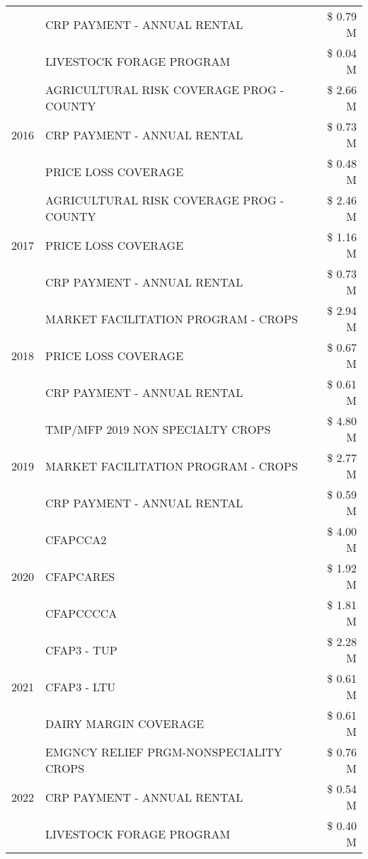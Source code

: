 \begin{tabular}{llr}
 & CRP PAYMENT - ANNUAL RENTAL & \$ 0.79 M \\
 & LIVESTOCK FORAGE PROGRAM & \$ 0.04 M \\
\cline{1-3}
\multirow[t]{3}{*}{2016} & AGRICULTURAL RISK COVERAGE PROG - COUNTY & \$ 2.66 M \\
 & CRP PAYMENT - ANNUAL RENTAL & \$ 0.73 M \\
 & PRICE LOSS COVERAGE & \$ 0.48 M \\
\cline{1-3}
\multirow[t]{3}{*}{2017} & AGRICULTURAL RISK COVERAGE PROG - COUNTY & \$ 2.46 M \\
 & PRICE LOSS COVERAGE & \$ 1.16 M \\
 & CRP PAYMENT - ANNUAL RENTAL & \$ 0.73 M \\
\cline{1-3}
\multirow[t]{3}{*}{2018} & MARKET FACILITATION PROGRAM - CROPS & \$ 2.94 M \\
 & PRICE LOSS COVERAGE & \$ 0.67 M \\
 & CRP PAYMENT - ANNUAL RENTAL & \$ 0.61 M \\
\cline{1-3}
\multirow[t]{3}{*}{2019} & TMP/MFP 2019 NON SPECIALTY CROPS & \$ 4.80 M \\
 & MARKET FACILITATION PROGRAM - CROPS & \$ 2.77 M \\
 & CRP PAYMENT - ANNUAL RENTAL & \$ 0.59 M \\
\cline{1-3}
\multirow[t]{3}{*}{2020} & CFAPCCA2 & \$ 4.00 M \\
 & CFAPCARES & \$ 1.92 M \\
 & CFAPCCCCA & \$ 1.81 M \\
\cline{1-3}
\multirow[t]{3}{*}{2021} & CFAP3 - TUP & \$ 2.28 M \\
 & CFAP3 - LTU & \$ 0.61 M \\
 & DAIRY MARGIN COVERAGE & \$ 0.61 M \\
\cline{1-3}
\multirow[t]{3}{*}{2022} & EMGNCY RELIEF PRGM-NONSPECIALITY CROPS & \$ 0.76 M \\
 & CRP PAYMENT - ANNUAL RENTAL & \$ 0.54 M \\
 & LIVESTOCK FORAGE PROGRAM & \$ 0.40 M \\
\cline{1-3}
\bottomrule
\end{tabular}
